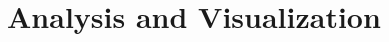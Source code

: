 \section{Analysis and Visualization} %
\label{sec:studies}




\clearpage


\clearpage




\clearpage
\newpage

